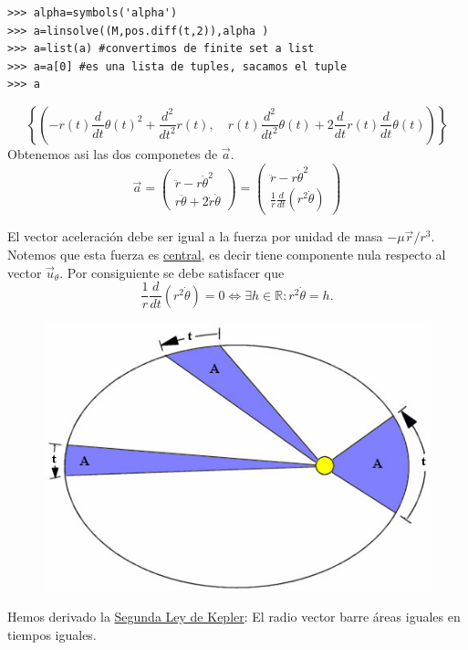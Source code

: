 \begin{lstlisting}
>>> alpha=symbols('alpha')
>>> a=linsolve((M,pos.diff(t,2)),alpha )
>>> a=list(a) #convertimos de finite set a list
>>> a=a[0] #es una lista de tuples, sacamos el tuple
>>> a
\end{lstlisting}

\[
 \left\{\left ( - r{\left (t \right )} \frac{d}{d t} \theta{\left (t \right )}^{2} + \frac{d^{2}}{d t^{2}}  r{\left (t \right )}, \quad r{\left (t \right )} \frac{d^{2}}{d t^{2}}  \theta{\left (t \right )} + 2 \frac{d}{d t} r{\left (t \right )} \frac{d}{d t} \theta{\left (t \right )}\right )\right\}
\]
Obtenemos asi las dos componetes de $\vec{a}$.
\[
\vec{a}=\left(\begin{array}{c}
\ddot{r}-r\dot{\theta}^2 \\
r\ddot{\theta}+2\dot{r}\dot{\theta}
\end{array}
\right)=
\left(\begin{array}{c}
\ddot{r}-r\dot{\theta}^2 \\
\frac{1}{r}\frac{d}{dt} \left( r^2\dot{\theta} \right)
\end{array}
\right)
\]


El vector aceleración debe ser igual a la fuerza por unidad de masa $-\mu \vec{r}/r^3$. Notemos que esta fuerza es
\href{http://es.wikipedia.org/wiki/Campo_central}{central}, es decir tiene componente nula
respecto al vector $\vec{u}_{\theta}$. Por consiguiente se debe satisfacer que
\[\frac{1}{r}\frac{d}{dt} \left( r^2\dot{\theta} \right)=0\Longleftrightarrow \exists h\in\mathbb{R}: \boxed{ r^2\dot{\theta}=h}. \]




\begin{figure}
\includegraphics[scale=.3]{imagenes/2leykepler.jpeg}\\
\end{figure}
Hemos derivado la \href{http://es.wikipedia.org/wiki/Leyes_de_Kepler}{Segunda Ley de Kepler}: El radio vector barre áreas iguales en tiempos iguales.



